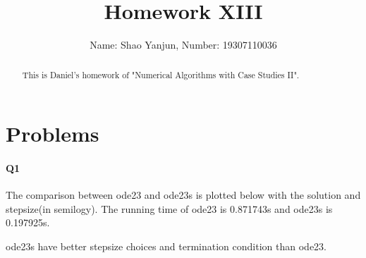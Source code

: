\documentclass[11pt]{article}
\title{Homework XIII}
\author{Name: Shao Yanjun, Number: 19307110036}
\begin{document}
\maketitle

\begin{abstract}
This is Daniel's homework of  "Numerical Algorithms with Case Studies II".
\end{abstract}
\section{Problems}
\paragraph{Q1}
The comparison between ode23 and ode23s is plotted below with the solution and stepsize(in semilogy). The running time of ode23 is 0.871743s and ode23s is 0.197925s.
\begin{figure}[H]
	\centering
\end{figure}
ode23s have better stepsize choices and termination condition than ode23.
\end{document}
